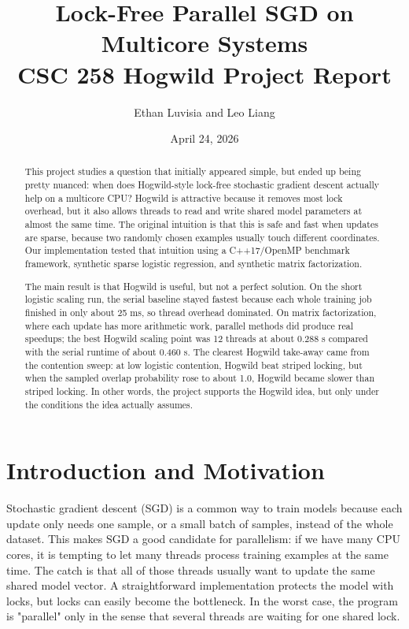 \documentclass[11pt]{article}
\title{Lock-Free Parallel SGD on Multicore Systems\\CSC 258 Hogwild Project Report}
\author{Ethan Luvisia and Leo Liang}
\date{April 24, 2026}
\begin{document}
\maketitle
\setcounter{tocdepth}{1}

\begin{abstract}
This project studies a question that initially appeared simple, but ended up being pretty nuanced: when does Hogwild-style lock-free stochastic gradient descent actually help on a multicore CPU? Hogwild is attractive because it removes most lock overhead, but it also allows threads to read and write shared model parameters at almost the same time. The original intuition is that this is safe and fast when updates are sparse, because two randomly chosen examples usually touch different coordinates. Our implementation tested that intuition using a C++17/OpenMP benchmark framework, synthetic sparse logistic regression, and synthetic matrix factorization.

The main result is that Hogwild is useful, but not a perfect solution. On the short logistic scaling run, the serial baseline stayed fastest because each whole training job finished in only about 25 ms, so thread overhead dominated. On matrix factorization, where each update has more arithmetic work, parallel methods did produce real speedups; the best Hogwild scaling point was 12 threads at about 0.288 s compared with the serial runtime of about 0.460 s. The clearest Hogwild take-away came from the contention sweep: at low logistic contention, Hogwild beat striped locking, but when the sampled overlap probability rose to about 1.0, Hogwild became slower than striped locking. In other words, the project supports the Hogwild idea, but only under the conditions the idea actually assumes.
\end{abstract}

\tableofcontents
\newpage

\section{Introduction and Motivation}

Stochastic gradient descent (SGD) is a common way to train models because each update only needs one sample, or a small batch of samples, instead of the whole dataset. This makes SGD a good candidate for parallelism: if we have many CPU cores, it is tempting to let many threads process training examples at the same time. The catch is that all of those threads usually want to update the same shared model vector. A straightforward implementation protects the model with locks, but locks can easily become the bottleneck. In the worst case, the program is "parallel" only in the sense that several threads are waiting for one shared lock.
\end{document}
